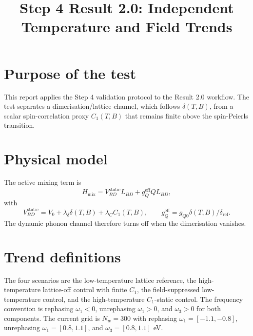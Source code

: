 \documentclass[11pt]{article}
\title{Step 4 Result 2.0: Independent Temperature and Field Trends}
\author{}
\date{}
\begin{document}
\maketitle
\section{Purpose of the test}
This report applies the Step 4 validation protocol to the Result 2.0 workflow. The test separates a dimerisation/lattice channel, which follows $\delta(T,B)$, from a scalar spin-correlation proxy $C_1(T,B)$ that remains finite above the spin-Peierls transition.
\section{Physical model}
The active mixing term is
\begin{equation}
H_{\mathrm{mix}} = V_{BD}^{\mathrm{static}} L_{BD} + g_Q^{\mathrm{eff}} Q L_{BD},
\end{equation}
with
\begin{equation}
V_{BD}^{\mathrm{static}} = V_0 + \lambda_\delta \delta(T,B) + \lambda_C C_1(T,B),
\qquad
g_Q^{\mathrm{eff}} = g_{Q0} \delta(T,B) / \delta_{\mathrm{ref}}.
\end{equation}
The dynamic phonon channel therefore turns off when the dimerisation vanishes.
\section{Trend definitions}
The four scenarios are the low-temperature lattice reference, the high-temperature lattice-off control with finite $C_1$, the field-suppressed low-temperature control, and the high-temperature $C_1$-static control. The frequency convention is rephasing $\omega_1 < 0$, unrephasing $\omega_1 > 0$, and $\omega_3 > 0$ for both components. The current grid is $N_w=300$ with rephasing $\omega_1=[-1.1,-0.8]$, unrephasing $\omega_1=[0.8,1.1]$, and $\omega_3=[0.8,1.1]$ eV.
\end{document}
